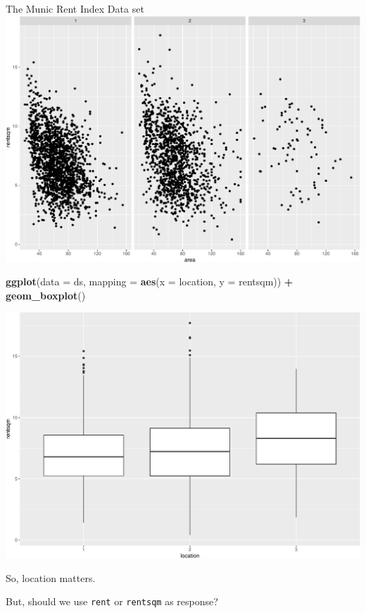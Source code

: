 \documentclass[
  ignorenonframetext,
]{beamer}
\newenvironment{Shaded}{\begin{snugshade}}{\end{snugshade}}
\newcommand{\AttributeTok}[1]{\textcolor[rgb]{0.13,0.29,0.53}{#1}}
\newcommand{\FunctionTok}[1]{\textcolor[rgb]{0.13,0.29,0.53}{\textbf{#1}}}
\newcommand{\NormalTok}[1]{#1}
\newcommand{\SpecialCharTok}[1]{\textcolor[rgb]{0.81,0.36,0.00}{\textbf{#1}}}
\begin{document}
\begin{frame}[fragile]
\begin{block}{The Munic Rent Index Data set}
\includegraphics{1Intro_files/figure-beamer/unnamed-chunk-9-1.pdf}

\begin{Shaded}
\begin{Highlighting}[]
\FunctionTok{ggplot}\NormalTok{(}\AttributeTok{data =}\NormalTok{ ds, }\AttributeTok{mapping =} \FunctionTok{aes}\NormalTok{(}\AttributeTok{x =}\NormalTok{ location, }\AttributeTok{y =}\NormalTok{ rentsqm)) }\SpecialCharTok{+} 
  \FunctionTok{geom\_boxplot}\NormalTok{()}
\end{Highlighting}
\end{Shaded}

\includegraphics{1Intro_files/figure-beamer/unnamed-chunk-9-2.pdf}

So, location matters.

But, should we use \texttt{rent} or \texttt{rentsqm} as response?


\end{block}
\end{frame}
\end{document}
